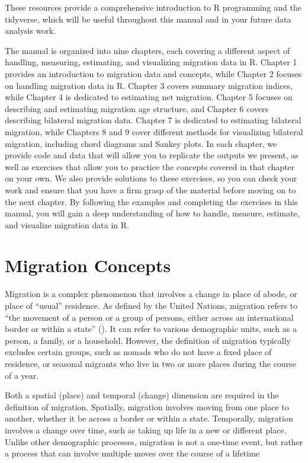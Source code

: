 \documentclass[
]{book}
\begin{document}
These resources provide a comprehensive introduction to R programming and the tidyverse, which will be useful throughout this manual and in your future data analysis work.

The manual is organized into nine chapters, each covering a different aspect of handling, measuring, estimating, and visualizing migration data in R. Chapter 1 provides an introduction to migration data and concepts, while Chapter 2 focuses on handling migration data in R. Chapter 3 covers summary migration indices, while Chapter 4 is dedicated to estimating net migration. Chapter 5 focuses on describing and estimating migration age structure, and Chapter 6 covers describing bilateral migration data. Chapter 7 is dedicated to estimating bilateral migration, while Chapters 8 and 9 cover different methods for visualizing bilateral migration, including chord diagrams and Sankey plots. In each chapter, we provide code and data that will allow you to replicate the outputs we present, as well as exercises that allow you to practice the concepts covered in that chapter on your own. We also provide solutions to these exercises, so you can check your work and ensure that you have a firm grasp of the material before moving on to the next chapter. By following the examples and completing the exercises in this manual, you will gain a deep understanding of how to handle, measure, estimate, and visualize migration data in R.

\hypertarget{migration-concepts}{%
\chapter{Migration Concepts}\label{migration-concepts}}

Migration is a complex phenomenon that involves a change in place of abode, or place of ``usual'' residence. As defined by the United Nations, migration refers to ``the movement of a person or a group of persons, either across an international border or within a state'' (\citet{UnitedNations1983}). It can refer to various demographic units, such as a person, a family, or a household. However, the definition of migration typically excludes certain groups, such as nomads who do not have a fixed place of residence, or seasonal migrants who live in two or more places during the course of a year.

Both a spatial (place) and temporal (change) dimension are required in the definition of migration. Spatially, migration involves moving from one place to another, whether it be across a border or within a state. Temporally, migration involves a change over time, such as taking up life in a new or different place. Unlike other demographic processes, migration is not a one-time event, but rather a process that can involve multiple moves over the course of a lifetime
\end{document}
